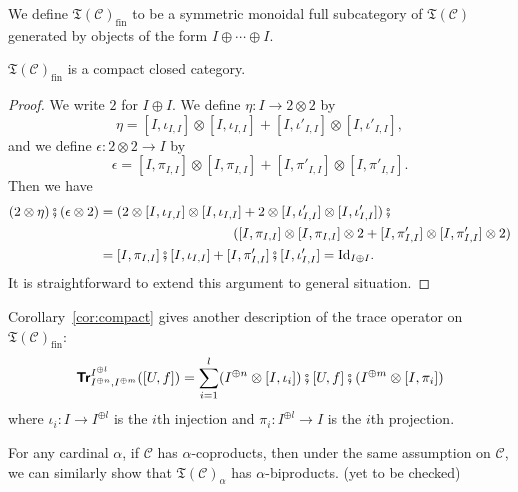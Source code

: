 We define $\mathfrak{T}(\mathcal{C})_{\mathrm{fin}}$ to be a symmetric monoidal
full subcategory of $\mathfrak{T}(\mathcal{C})$ generated by
objects of the form $I \oplus \cdots \oplus I$.
\begin{corollary}\label{cor:compact}
  $\mathfrak{T}(\mathcal{C})_{\mathrm{fin}}$ is a compact closed category.
\end{corollary}
\begin{proof}
  We write $2$ for $I \oplus I$.
  We define $\eta \colon I \to 2 \otimes 2$ by
  \begin{equation*}
    \eta = [I,\iota_{I,I}] \otimes [I,\iota_{I,I}] +
    [I,\iota'_{I,I}] \otimes [I,\iota'_{I,I}],
  \end{equation*}
  and we define $\epsilon \colon 2 \otimes 2 \to I$ by
  \begin{equation*}
    \epsilon = [I,\pi_{I,I}] \otimes [I,\pi_{I,I}] +
    [I,\pi'_{I,I}] \otimes [I,\pi'_{I,I}].
  \end{equation*}
  Then we have
  \begin{align*}
    (2 \otimes \eta) \fatsemi (\epsilon \otimes 2)
    &= (2 \otimes [I,\iota_{I,I}] \otimes [I,\iota_{I,I}] +
      2 \otimes [I,\iota'_{I,I}] \otimes [I,\iota'_{I,I}]) \fatsemi {} \\
    &\hspace{10em}
      ([I,\pi_{I,I}] \otimes [I,\pi_{I,I}] \otimes 2 + [I,\pi'_{I,I}] \otimes
      [I,\pi'_{I,I}] \otimes 2) \\
    &= [I,\pi_{I,I}] \fatsemi [I,\iota_{I,I}] + [I,\pi'_{I,I}]
      \fatsemi [I,\iota'_{I,I}] = \Id_{I \oplus I}.
  \end{align*}
  It is straightforward to extend this argument to general situation.
\end{proof}

\begin{remark}
  Corollary~\ref{cor:compact} gives another
  description of the trace operator on $\mathfrak{T}(\mathcal{C})_{\mathrm{fin}}$:
  \begin{equation*}
    {\normalfont\textsf{\textbf{Tr}}}^{I^{\oplus l}}_{I^{\oplus n},I^{\oplus m}}([U,f])
    = \sum_{i = 1}^{l}
    (I^{\oplus n} \otimes [I,\iota_{i}]) \fatsemi [U,f] \fatsemi
    (I^{\oplus m} \otimes [I,\pi_{i}])
  \end{equation*}
  where $\iota_{i} \colon I \to I^{\oplus l}$ is the $i$th
  injection and $\pi_{i} \colon I^{\oplus l} \to I$ is the $i$th
  projection.
\end{remark}

\begin{remark}
  For any cardinal $\alpha$,
  if $\mathcal{C}$ has $\alpha$-coproducts, then under the same
  assumption on $\mathcal{C}$, we can similarly show that
  $\mathfrak{T}(\mathcal{C})_{\alpha}$ has $\alpha$-biproducts.
  (yet to be checked)
\end{remark}


